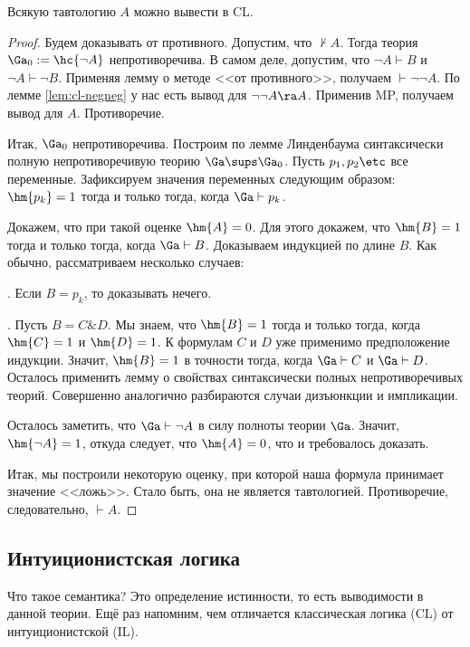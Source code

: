 \documentclass[a4paper,draft]{article}
\let\amper\&
\def\&{\mathbin{\amper}}
\begin{document}
\begin{theorem}
  Всякую тавтологию $A$ можно вывести в CL.
\end{theorem}
\begin{proof}
  Будем доказывать от противного. Допустим, что $\nvdash A$. Тогда теория $\Ga_0 := \hc{\neg A}$ непротиворечива.
  В самом деле, допустим, что $\neg A \vdash B$ и $\neg A \vdash \neg B$. Применяя лемму о методе <<от противного>>,
  получаем $\vdash \neg\neg A$. По лемме \ref{lem:cl-negneg} у нас есть вывод для $\neg\neg A \ra A$.
  Применив MP, получаем вывод для $A$. Противоречие.

  Итак, $\Ga_0$ непротиворечива. Построим по лемме Линденбаума синтаксически полную непротиворечивую
  теорию $\Ga \sups \Ga_0$. Пусть $p_1, p_2\etc$ все переменные. Зафиксируем значения
  переменных следующим образом: $\hm{p_k} = 1$ тогда и только тогда, когда $\Ga \vdash p_k$.

  Докажем, что при такой оценке $\hm{A} = 0$.
  Для этого докажем, что $\hm{B} = 1$ тогда и только тогда, когда $\Ga \vdash B$.
  Доказываем индукцией по длине $B$. Как обычно, рассматриваем несколько случаев:

  . Если $B = p_k$, то доказывать нечего.

  . Пусть $B = C \& D$. Мы знаем, что $\hm{B} = 1$ тогда и только тогда, когда $\hm{C} = 1$ и
  $\hm{D} = 1$. К формулам $C$ и $D$ уже применимо предположение индукции.
  Значит, $\hm{B} = 1$ в точности тогда, когда $\Ga \vdash C$ и $\Ga \vdash D$. Осталось применить лемму
  о свойствах синтаксически полных непротиворечивых теорий.
  Совершенно аналогично разбираются случаи дизъюнкции и импликации.

  Осталось заметить, что $\Ga \vdash \neg A$ в силу полноты теории $\Ga$. Значит, $\hm{\neg A} = 1$,
  откуда следует, что $\hm{A} = 0$, что и требовалось доказать.

  Итак, мы построили некоторую оценку, при которой наша формула принимает значение <<ложь>>.
  Стало быть, она не является тавтологией. Противоречие, следовательно, $\vdash A$.
\end{proof}

\subsection{Интуиционистская логика}

Что такое семантика? Это определение истинности, то есть выводимости в данной теории.
Ещё раз напомним, чем отличается классическая логика (CL) от интуиционистской (IL).
\end{document}
